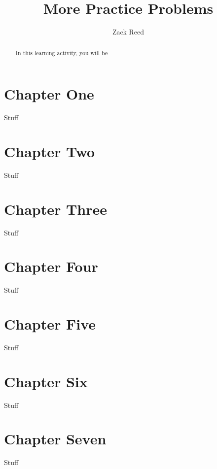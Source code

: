 \documentclass{ximera}
\author{Zack Reed}
\title{More Practice Problems}
\begin{document}
\begin{abstract}

    In this learning activity, you will be 
\end{abstract}
\maketitle

\section{Chapter One}

Stuff

\section{Chapter Two}

Stuff

\section{Chapter Three}

Stuff

\section{Chapter Four}

Stuff

\section{Chapter Five}

Stuff

\section{Chapter Six}

Stuff

\section{Chapter Seven}

Stuff
\end{document}
